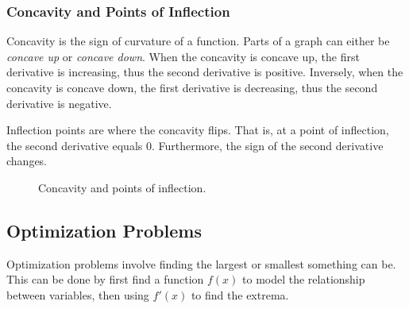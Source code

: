 \subsubsection{Concavity and Points of Inflection}
\label{sec:concavity}
Concavity is the sign of curvature of a function. Parts of a graph can either be \textit{concave up} or \textit{concave down}. When the concavity is concave up, the first derivative is increasing, thus the second derivative is positive. Inversely, when the concavity is concave down, the first derivative is decreasing, thus the second derivative is negative.

Inflection points are where the concavity flips. That is, at a point of inflection, the second derivative equals $0$. Furthermore, the sign of the second derivative changes.

\begin{figure}[H]
	\begin{center}
		\caption{Concavity and points of inflection.}
		\label{fig:concavityinflection}
	\end{center}
\end{figure}

\subsection{Optimization Problems}
Optimization problems involve finding the largest or smallest something can be. This can be done by first find a function $f(x)$ to model the relationship between variables, then using $f'(x)$ to find the extrema.

